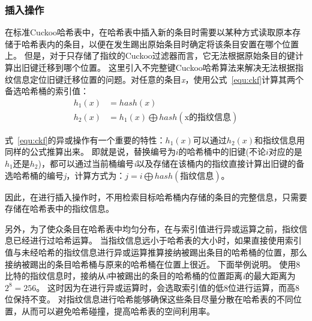\subsubsection{插入操作}
在标准Cuckoo哈希表中，在哈希表中插入新的条目时需要以某种方式读取原本存储于哈希表内的条目，以便在发生踢出原始条目时确定将该条目安置在哪个位置上。
但是，对于只存储了指纹的Cuckoo过滤器而言，它无法根据原始条目的键计算出旧键迁移到哪个位置。
这里引入不完整键Cuckoo哈希算法来解决无法根据指纹信息定位旧键迁移位置的问题。对任意的条目\textit{x}，使用公式~\ref{equ:ckf}计算其两个备选哈希桶的索引值：
\begin{equation}
\begin{split}
h_1\left(x\right) &= hash\left(x\right) \\
h_2(x) &= h_1(x)\bigoplus hash(\text{x的指纹信息})
\end{split}
\label{equ:ckf}
\end{equation}

式~\ref{equ:ckf}的异或操作有一个重要的特性：$h_1(x)$可以通过$h_2(x)$和指纹信息用同样的公式推算出来。
即就是说，替换编号为$i$的哈希桶中的旧键(不论$i$对应的是$h_1$还是$h_2$)，都可以通过当前桶编号\textit{i}以及存储在该桶内的指纹直接计算出旧键的备选哈希桶的编号\textit{j}，计算方式为：$j = i \bigoplus hash(\text{指纹信息})$。

因此，在进行插入操作时，不用检索目标哈希桶内存储的条目的完整信息，只需要存储在哈希表中的指纹信息。

另外，为了使众条目在哈希表中均匀分布，在与索引值进行异或运算之前，指纹信息已经进行过哈希运算。
当指纹信息远小于哈希表的大小时，如果直接使用索引值与未经哈希的指纹信息进行异或运算推算接纳被踢出条目的哈希桶的位置，那么接纳被踢出的条目哈希桶与原来的哈希桶在位置上很近。
下面举例说明。
使用8比特的指纹信息时，接纳从\textit{i}中被踢出的条目的哈希桶的位置距离\textit{i}的最大距离为$2^8 = 256$。
这时因为在进行异或运算时，会选取索引值的低8位进行运算，而高8位保持不变。
对指纹信息进行哈希能够确保这些条目尽量分散在哈希表的不同位置，从而可以避免哈希碰撞，提高哈希表的空间利用率。

